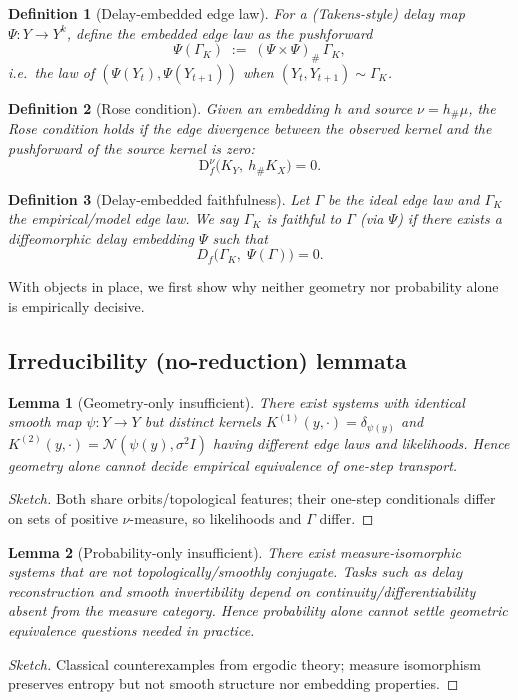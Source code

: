 \documentclass[11pt]{article}
\newtheorem{definition}{Definition}
\newtheorem{lemma}{Lemma}
\newcommand{\Df}{\mathrm{D}_f}
\newcommand{\1}{\mathbf{1}}
\newcommand{\push}{\#}
\begin{document}
\begin{definition}[Delay-embedded edge law]
For a (Takens-style) delay map $\Psi:Y\to Y^k$, define the embedded edge law as the pushforward
\[
\Psi(\Gamma_K) \;:=\; (\Psi\times \Psi)_{\push}\,\Gamma_K,
\]
i.e.\ the law of $(\Psi(Y_t),\Psi(Y_{t+1}))$ when $(Y_t,Y_{t+1})\sim \Gamma_K$.
\end{definition}

\begin{definition}[Rose condition]
Given an embedding \(h\) and source \(\nu=h_\push\mu\), the \emph{Rose condition} holds if the edge divergence between the observed kernel and the pushforward of the source kernel is zero:
\[
\Df^{\nu}\!\big(K_Y,\ h_\push K_X\big)=0.
\]
\end{definition}

\begin{definition}[Delay-embedded faithfulness]
Let $\Gamma$ be the ideal edge law and $\Gamma_K$ the empirical/model edge law.
We say $\Gamma_K$ is \emph{faithful} to $\Gamma$ (via $\Psi$) if there exists a diffeomorphic delay embedding $\Psi$ such that
\[
D_f\!\big(\Gamma_K,\; \Psi(\Gamma)\big)=0.
\]
\end{definition}
With objects in place, we first show why neither geometry nor probability alone is empirically decisive.


\subsection{Irreducibility (no-reduction) lemmata}
\begin{lemma}[Geometry-only insufficient]\label{lem:G}
There exist systems with identical smooth map \(\psi:Y\to Y\) but distinct kernels \(K^{(1)}(y,\cdot)=\delta_{\psi(y)}\) and \(K^{(2)}(y,\cdot)=\mathcal N(\psi(y),\sigma^2 I)\) having different edge laws and likelihoods. Hence geometry alone cannot decide empirical equivalence of one-step transport.
\end{lemma}
\begin{proof}[Sketch]
Both share orbits/topological features; their one-step conditionals differ on sets of positive \(\nu\)-measure, so likelihoods and \(\Gamma\) differ.
\end{proof}

\begin{lemma}[Probability-only insufficient]\label{lem:P}
There exist measure-isomorphic systems that are not topologically/smoothly conjugate. Tasks such as delay reconstruction and smooth invertibility depend on continuity/differentiability absent from the measure category. Hence probability alone cannot settle geometric equivalence questions needed in practice.
\end{lemma}
\begin{proof}[Sketch]
Classical counterexamples from ergodic theory; measure isomorphism preserves entropy but not smooth structure nor embedding properties.
\end{proof}
\end{document}
